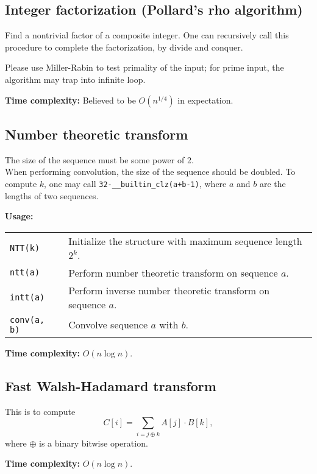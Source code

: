 \subsection{Integer factorization (Pollard's rho algorithm)}
Find a nontrivial factor of a composite integer. One can recursively call this procedure to complete the factorization, by divide and conquer. \par
\Warning Please use Miller-Rabin to test primality of the input; for prime input, the algorithm may trap into infinite loop. \par
\textbf{Time complexity:} Believed to be $O(n^{1/4})$ in expectation. \par


\subsection{Number theoretic transform}
\Warning The size of the sequence must be some power of 2. \\
\Warning When performing convolution, the size of the sequence should be doubled. To compute $k$, one may call \lstinline|32-__builtin_clz(a+b-1)|, where $a$ and $b$ are the lengths of two sequences.  \par
\textbf{Usage:} \\[0.1cm]
\begin{tabular}{p{2cm} p{9.5cm}}
  \lstinline|NTT(k)| & Initialize the structure with maximum sequence length $2^k$. \\
  \lstinline|ntt(a)| & Perform number theoretic transform on sequence $a$.  \\
  \lstinline|intt(a)| & Perform inverse number theoretic transform on sequence $a$. \\
  \lstinline|conv(a, b)| & Convolve sequence $a$ with $b$. \\
\end{tabular} \par
\textbf{Time complexity:} $O(n \log n)$. \par


\subsection{Fast Walsh-Hadamard transform}
This is to compute $$C[i] = \sum_{i = j \oplus k} A[j] \cdot B[k],$$ where $\oplus$ is a binary bitwise operation. \par
\textbf{Time complexity:} $O(n \log n)$. \par


